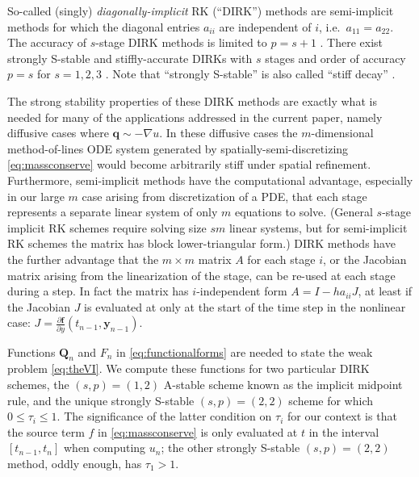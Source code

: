 \documentclass[final,leqno,onefignum,onetabnum]{siamltex1213bueler}
\newcommand\bbf{\mathbf{f}}
\newcommand\bq{\mathbf{q}}
\newcommand\by{\mathbf{y}}
\newcommand\bQ{\mathbf{Q}}
\renewcommand{\grad}{\nabla}
\begin{document}
So-called (singly) \emph{diagonally-implicit} RK (``DIRK'') methods are semi-implicit methods for which the diagonal entries $a_{ii}$ are independent of $i$, i.e.~$a_{11}=a_{22}$.  The accuracy of $s$-stage DIRK methods is limited to $p=s+1$ \cite{AscherPetzold}.  There exist strongly S-stable and stiffly-accurate \cite{AscherPetzold} DIRKs with $s$ stages and order of accuracy $p=s$ for $s=1,2,3$ \cite{Alexander1977}.  Note that ``strongly S-stable'' is also called ``stiff decay'' \cite{AscherPetzold}.

The strong stability properties of these DIRK methods are exactly what is needed for many of the applications addressed in the current paper, namely diffusive cases where $\bq \sim - \grad u$.  In these diffusive cases the $m$-dimensional method-of-lines ODE system generated by spatially-semi-discretizing \eqref{eq:massconserve} would become arbitrarily stiff under spatial refinement.  Furthermore, semi-implicit methods have the computational advantage, especially in our large $m$ case arising from discretization of a PDE, that each stage represents a separate linear system of only $m$ equations to solve.  (General $s$-stage implicit RK schemes require solving size $sm$ linear systems, but for semi-implicit RK schemes the matrix has block lower-triangular form.)  DIRK methods have the further advantage that the $m\times m$ matrix $A$ for each stage $i$, or the Jacobian matrix arising from the linearization of the stage, can be re-used at each stage during a step. In fact the matrix has $i$-independent form $A = I - h a_{ii} J$, at least if the Jacobian $J$ is evaluated at only at the start of the time step in the nonlinear case: $J = \frac{\partial \bbf}{\partial y}(t_{n-1},\by_{n-1})$.

Functions $\bQ_n$ and $F_n$ in \eqref{eq:functionalforms} are needed to state the weak problem \eqref{eq:theVI}.  We compute these functions for two particular DIRK schemes, the $(s,p)=(1,2)$ A-stable scheme known as the implicit midpoint rule, and the unique strongly S-stable $(s,p)=(2,2)$ scheme for which $0\le \tau_i\le 1$.  The significance of the latter condition on $\tau_i$ for our context is that the source term $f$ in \eqref{eq:massconserve} is only evaluated at $t$ in the interval $[t_{n-1},t_n]$ when computing $u_n$; the other strongly S-stable $(s,p)=(2,2)$ method, oddly enough, has $\tau_1>1$.
\end{document}
